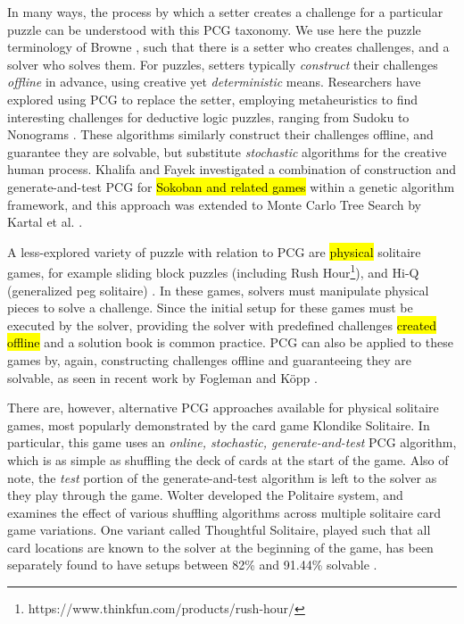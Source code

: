 \documentclass[journal]{IEEEtran}
\begin{document}



In many ways, the process by which a setter creates a challenge for a particular puzzle can be understood with this PCG taxonomy. We use here the puzzle terminology of Browne \cite{PUZZLENATURE}, such that there is a setter who creates challenges, and a solver who solves them.
For puzzles, setters typically {\it construct} their challenges {\it offline} in advance, using creative yet {\it deterministic} means. Researchers have explored using PCG to replace the setter, employing metaheuristics to find interesting challenges for deductive logic puzzles, ranging from Sudoku \cite{SUDOKU} to Nonograms \cite{NONOGRAM}. These algorithms similarly construct their challenges offline, and guarantee they are solvable, but substitute {\it stochastic} algorithms for the creative human process.
Khalifa and Fayek\cite{PUZZLELANG} investigated a combination of construction and generate-and-test PCG for \hl{Sokoban and related games} within a genetic algorithm framework, and this approach was extended to Monte Carlo Tree Search by Kartal et al. \cite{SOKOBAN}.

A less-explored variety of puzzle with relation to PCG 
are \hl{physical} solitaire games, for example
sliding block puzzles \cite{FIFTEEN} (including Rush Hour\footnote{https://www.thinkfun.com/products/rush-hour/}), 
and Hi-Q (generalized peg solitaire) \cite{PEG}. In these games, solvers must manipulate physical pieces to solve a challenge. Since the initial setup for these games must be executed by the solver, providing the solver with predefined challenges \hl{created offline} and a solution book is common practice. PCG can also be applied to these games by, again, constructing challenges offline and guaranteeing they are solvable, as seen in recent work by Fogleman \cite{RUSHHOUR} and K{\"o}pp \cite{TANGRAM}. 

There are, however, alternative PCG approaches available for physical solitaire games, most popularly demonstrated by the card game Klondike Solitaire. In particular, this game uses an {\it online, stochastic, generate-and-test} PCG algorithm, which is as simple as shuffling the deck of cards at the start of the game. Also of note, the {\it test} portion of the generate-and-test algorithm is left to the solver as they play through the game. Wolter \cite{SOLITAIREVARIANTS} developed the Politaire system, and examines the effect of various shuffling algorithms across multiple solitaire card game variations. One variant called Thoughtful Solitaire, played such that all card locations are known to the solver at the beginning of the game, has been separately found to have setups between 82\% and 91.44\% solvable \cite{THOUGHTFUL}. 
\end{document}
